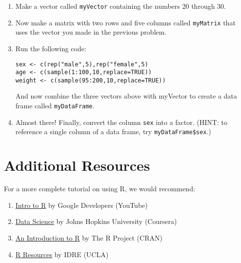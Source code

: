 \begin{enumerate}
	\item Make a vector called \verb|myVector| containing the numbers 20 through 30.
	
	\item Now make a matrix with two rows and five columns called \verb|myMatrix| that uses the vector you made in the previous problem.
	
	\item Run the following code:
	
		\begin{framed}
		\begin{Verbatim}[samepage=TRUE]
sex <- c(rep("male",5),rep("female",5)
age <- c(sample(1:100,10,replace=TRUE))
weight <- c(sample(95:200,10,replace=TRUE))
		\end{Verbatim}
		\end{framed}
	And now combine the three vectors above with myVector to create a data frame called \verb|myDataFrame|.
	
	\item Almost there! Finally, convert the column \verb|sex| into a factor. (HINT: to reference a single column of a data frame, try \verb|myDataFrame$sex|.)
\end{enumerate}
\section{Additional Resources}
For a more complete tutorial on using R, we would recommend:
\begin{enumerate}
	\item \href{https://www.youtube.com/playlist?list=PLOU2XLYxmsIK9qQfztXeybpHvru-TrqAP}{Intro to R} by Google Developers (YouTube)
	\item \href{https://www.coursera.org/specialization/jhudatascience/1/courses}{Data Science} by Johns Hopkins University (Coursera)
	\item \href{http://cran.r-project.org/doc/manuals/R-intro.html}{An Introduction to R} by The R Project (CRAN)
	\item \href{http://statistics.ats.ucla.edu/stat/r/}{R Resources} by IDRE (UCLA)
\end{enumerate}